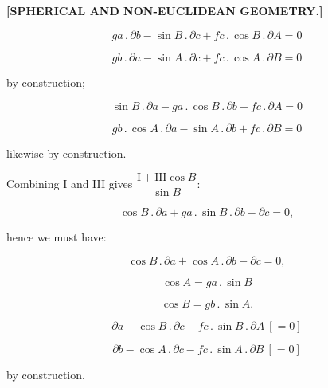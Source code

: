 \clearpage
{}%
\begin{center}
\textbf{[SPHERICAL AND NON-EUCLIDEAN GEOMETRY.]}

\smallskip

\end{center}

\[
\tag*{I.} ga\,.\,\partial b - \sin B\,.\,\partial c + fc\,.\,\cos B\,.\,\partial A = 0
\]

\[
\tag*{II.} gb\,.\,\partial a - \sin A\,.\,\partial c + fc\,.\,\cos A\,.\,\partial B = 0
\]

\noindent by construction;

\[
\tag*{III.} \sin B\,.\,\partial a - ga\,.\,\cos B\,.\,\partial b - fc\,.\,\partial A = 0
\]

\[
\tag*{IV.} gb\,.\,\cos A\,.\,\partial a - \sin A\,.\,\partial b + fc\,.\,\partial B = 0
\]

\noindent likewise by construction.

\begin{center}\end{center}

\noindent Combining I and III gives $\dfrac{\text{I}+\text{III}\cos B}{\sin B}$:

\[
\cos B\,.\,\partial a + ga\,.\,\sin B\,.\,\partial b - \partial c = 0,
\]

\noindent hence we must have:

\[
\tag*{V.} \cos B\,.\,\partial a + \cos A\,.\,\partial b - \partial c = 0,
\]

\[
\tag*{1)} \cos A = ga\,.\,\sin B
\]

\[
\tag*{2)} \cos B = gb\,.\,\sin A.
\]

\[
\tag*{VI.} \partial a - \cos B\,.\,\partial c - fc\,.\,\sin B\,.\,\partial A\ [= 0]
\]

\[
\tag*{VII.} \partial b - \cos A\,.\,\partial c - fc\,.\,\sin A\,.\,\partial B\ [= 0]
\]

\noindent by construction.
